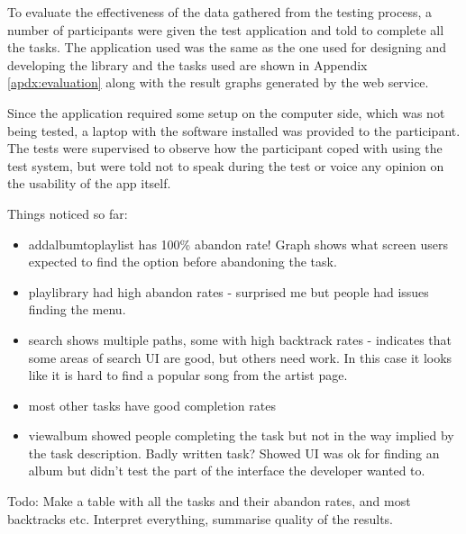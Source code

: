 To evaluate the effectiveness of the data gathered from the testing
process, a number of participants were given the test application
and told to complete all the tasks. The application used was the
same as the one used for designing and developing the library and
the tasks used are shown in Appendix \ref{apdx:evaluation} along
with the result graphs generated by the web service.

Since the application required some setup on the computer side,
which was not being tested, a laptop with the software installed
was provided to the participant. The tests were supervised to observe
how the participant coped with using the test system, but were told
not to speak during the test or voice any opinion on the usability
of the app itself.



Things noticed so far:

\begin{itemize}
  \item addalbumtoplaylist has 100\% abandon rate! Graph shows what screen users expected to find
        the option before abandoning the task.
  \item playlibrary had high abandon rates - surprised me but people had issues finding the menu.
  \item search shows multiple paths, some with high backtrack rates - indicates that some areas of
        search UI are good, but others need work. In this case it looks like it is hard to find a 
        popular song from the artist page.
  \item most other tasks have good completion rates
  \item viewalbum showed people completing the task but not in the way implied by the task description.
        Badly written task? Showed UI was ok for finding an album but didn't test the part of the
        interface the developer wanted to.
\end{itemize}

Todo:
Make a table with all the tasks and their abandon rates, and most backtracks etc.
Interpret everything, summarise quality of the results.



